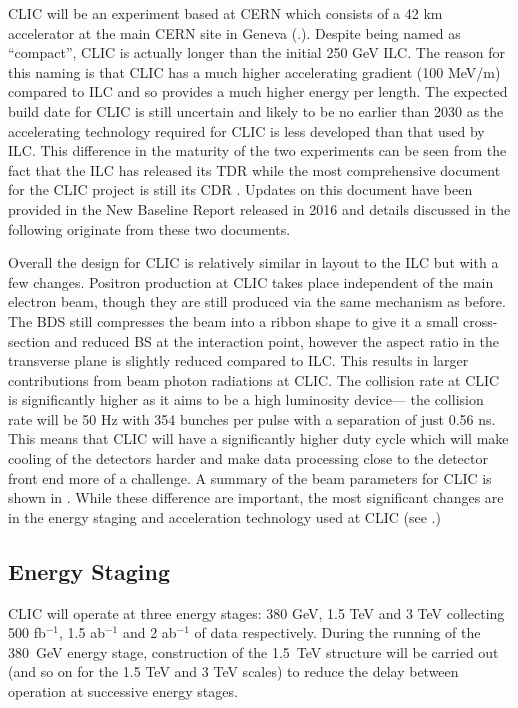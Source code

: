 \ac{CLIC} will be an experiment based at CERN which consists of a 42 km accelerator at the main CERN site in Geneva (.). Despite being named as “compact”, \ac{CLIC} is actually longer than the initial 250 GeV \ac{ILC}. The reason for this naming is that \ac{CLIC} has a much higher accelerating gradient (100 MeV/m) compared to ILC and so provides a much higher energy per length. The expected build date for \ac{CLIC} is still uncertain and likely to be no earlier than 2030 as the accelerating technology required for \ac{CLIC} is less developed than that used by \ac{ILC}. This difference in the maturity of the two experiments can be seen from the fact that the \ac{ILC} has released its \ac{TDR} while the most comprehensive document for the CLIC project is still its \ac{CDR} \cite{CDR}. Updates on this document have been provided in the New Baseline Report \cite{CLIC:2016zwp} released in 2016 and details discussed in the following originate from these two documents. 

Overall the design for \ac{CLIC} is relatively similar in layout to the \ac{ILC} but with a few changes. Positron production at \ac{CLIC} takes place independent of the main electron beam, though they are still produced via the same mechanism as before. The \ac{BDS} still compresses the beam into a ribbon shape to give it a small cross-section and reduced \ac{BS} at the interaction point, however the aspect ratio in the transverse plane is slightly reduced compared to \ac{ILC}. This results in larger contributions from beam photon radiations at \ac{CLIC}. The collision rate at \ac{CLIC} is significantly higher as it aims to be a high luminosity device--- the collision rate will be 50 Hz with 354 bunches per pulse with a separation of just 0.56 ns. This means that CLIC will have a significantly higher duty cycle which will make cooling of the detectors harder and make data processing close to the detector front end more of a challenge. A summary of the beam parameters for CLIC is shown in . While these difference are important, the most significant changes are in the energy staging and acceleration technology used at \ac{CLIC} (see .)

\subsection{Energy Staging}

CLIC will operate at three energy stages: 380 GeV, 1.5 TeV and 3 TeV collecting 500 fb${^{-1}}$, 1.5 ab${^{-1}}$ and 2 ab${^{-1}}$ of data respectively. During the running of the 380~GeV energy stage, construction of the 1.5~TeV structure will be carried out (and so on for the 1.5 TeV and 3 TeV scales) to reduce the delay between operation at successive energy stages. 


